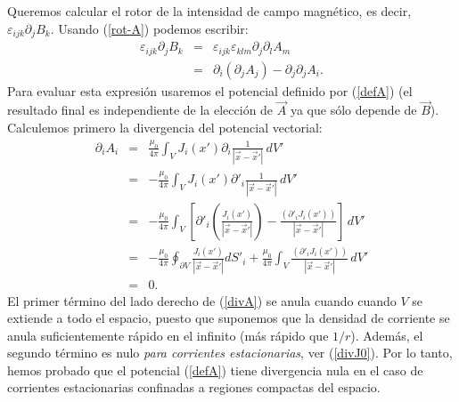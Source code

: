 Queremos calcular el rotor de la intensidad de campo magnético, es decir, $\varepsilon_{ijk}\partial_jB_k$. Usando (\ref{rot-A})
podemos escribir:
\begin{eqnarray}
 \varepsilon_{ijk}\partial_jB_k&=&\varepsilon_{ijk}\varepsilon_{
klm}\partial_j\partial_lA_m \\
&=&\partial_i(\partial_jA_j) -\partial_j\partial_jA_i. \label{rotB1}
\end{eqnarray}
Para evaluar esta expresión usaremos el potencial definido por (\ref{defA})
(el resultado final es independiente de la elección de $\vec{A}$ ya que sólo
depende de $\vec{B}$). Calculemos primero la divergencia del potencial
vectorial:
\begin{eqnarray}
\partial_iA_i&=&\frac{\mu_0}{4\pi}\int_VJ_i(x')\partial_i\frac{1}{\left\vert\vec
{x} -\vec{x}'\right\vert }\,dV' \\
&=& -\frac{\mu_0}{4\pi}\int_VJ_i(x')\partial'_i\frac{1}{\left\vert\vec{
x } -\vec{x}'\right\vert }\,dV' \\
&=&-\frac{\mu_0}{4\pi}\int_V\left[\partial'_i\left(\frac{J_i(x')}{
\left\vert\vec{x}-\vec{x}'\right\vert}\right)-\frac{
\left(\partial'_iJ_i(x')\right) } { \left\vert\vec{x} -\vec{x}'\right\vert
}\right]\,dV' \\
&=&-\frac{\mu_0}{4\pi}\oint_{\partial V}\frac{J_i(x')}{
\left\vert\vec{x}-\vec{x}'\right\vert}dS'_i+\frac{\mu_0}{4\pi}\int_V\frac{
\left(\partial'_iJ_i(x')\right) } {\left\vert\vec{x}
-\vec{x}'\right\vert}\,dV'  \label{divA} \\
&=&0. \label{divA0}
\end{eqnarray}
El primer término del lado derecho de (\ref{divA}) se anula cuando cuando $V$
se extiende a todo el espacio, puesto que suponemos que la densidad de corriente
se anula suficientemente rápido en el infinito (más rápido que $1/r$). Además, el segundo término es nulo \textit{para corrientes estacionarias}, ver (\ref{divJ0}). Por lo tanto, hemos probado que el potencial (\ref{defA}) tiene divergencia nula en el caso de corrientes
estacionarias confinadas a regiones compactas del espacio.

